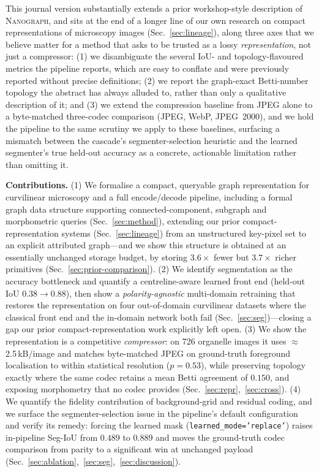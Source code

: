 \documentclass[10pt,a4paper]{article}
\newcommand{\method}{\textnormal{\textsc{Nanograph}}\xspace}
\begin{document}
This journal version substantially extends a prior workshop-style description
of \method, and sits at the end of a longer line of our own research on
compact representations of microscopy images (Sec.~\ref{sec:lineage}), along
three axes that we believe matter for a method that asks to be trusted as a
lossy \emph{representation}, not just a compressor: (1) we disambiguate the
several IoU- and topology-flavoured metrics the pipeline reports, which are
easy to conflate and were previously reported without precise definitions;
(2) we report the graph-exact Betti-number topology the abstract has always
alluded to, rather than only a qualitative description of it; and (3) we
extend the compression baseline from JPEG alone to a byte-matched
three-codec comparison (JPEG, WebP, JPEG~2000), and we hold the pipeline to
the same scrutiny we apply to these baselines, surfacing a mismatch between
the cascade's segmenter-selection heuristic and the learned segmenter's true
held-out accuracy as a concrete, actionable limitation rather than omitting
it.

\noindent\textbf{Contributions.}
(1) We formalise a compact, queryable graph representation for curvilinear
microscopy and a full encode/decode pipeline, including a formal graph data
structure supporting connected-component, subgraph and morphometric queries
(Sec.~\ref{sec:method}), extending our prior compact-representation systems
(Sec.~\ref{sec:lineage}) from an unstructured key-pixel set to an explicit
attributed graph---and we show this structure is obtained at an essentially
unchanged storage budget, by storing $3.6\times$ fewer but $3.7\times$
richer primitives (Sec.~\ref{sec:prior-comparison}).
(2) We identify segmentation as the accuracy bottleneck and quantify a
centreline-aware learned front end (held-out IoU $0.38\!\to\!0.88$), then show
a \emph{polarity-agnostic} multi-domain retraining that restores the
representation on four out-of-domain curvilinear datasets where the classical
front end and the in-domain network both fail (Sec.~\ref{sec:seg})---closing
a gap our prior compact-representation work explicitly left open.
(3) We show the representation is a competitive \emph{compressor}: on 726
organelle images it uses $\approx$\,2.5\,kB/image and matches byte-matched
JPEG on ground-truth foreground localisation to within statistical resolution
($p=0.53$), while preserving topology exactly where the same codec retains a
mean Betti agreement of $0.150$, and exposing morphometry that no codec
provides (Sec.~\ref{sec:repr},~\ref{sec:cross}).
(4) We quantify the fidelity contribution of background-grid and residual
coding, and we surface the segmenter-selection issue in the pipeline's
default configuration and verify its remedy: forcing the learned mask
(\texttt{learned\_mode='replace'}) raises in-pipeline Seg-IoU from $0.489$
to $0.889$ and moves the ground-truth codec comparison from parity to a
significant win at unchanged payload
(Sec.~\ref{sec:ablation},~\ref{sec:seg},~\ref{sec:discussion}).
\end{document}
